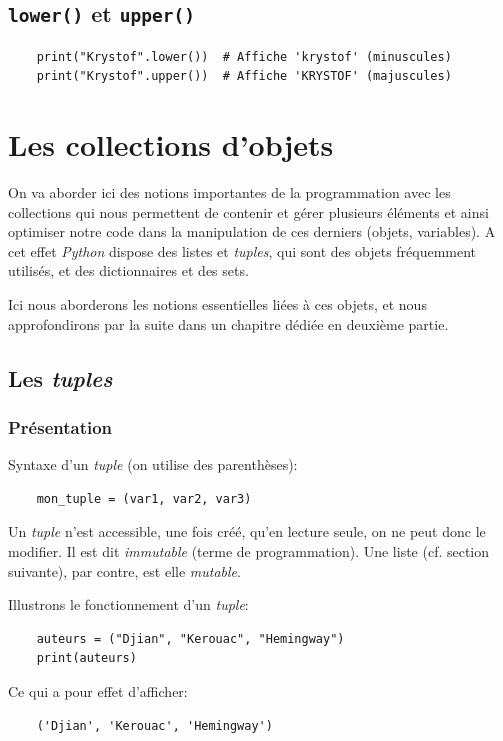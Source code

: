 \documentclass[a4paper,11pt]{book}
\begin{document}
\section{\texttt{lower()} et \texttt{upper()}}
\begin{verbatim}
    print("Krystof".lower())  # Affiche 'krystof' (minuscules)
    print("Krystof".upper())  # Affiche 'KRYSTOF' (majuscules)
\end{verbatim}
\medskip

\chapter{Les collections d'objets}\label{collections}
On va aborder ici des notions importantes de la programmation avec les collections qui nous permettent de contenir et gérer plusieurs éléments et ainsi optimiser notre code dans la manipulation de ces derniers (objets, variables). A cet effet \textit{Python} dispose des listes et \textit{tuples}, qui sont des objets fréquemment utilisés, et des dictionnaires et des sets.
\medskip

Ici nous aborderons les notions essentielles liées à ces objets, et nous approfondirons par la suite dans un chapitre dédiée en deuxième partie.
\medskip

\section{Les \textit{tuples}}
\subsection*{Présentation}
Syntaxe d'un \textit{tuple} (on utilise des parenthèses):
\begin{verbatim}
    mon_tuple = (var1, var2, var3)
\end{verbatim}
\medskip

Un \textit{tuple} n'est accessible, une fois créé, qu'en lecture seule, on ne peut donc le modifier. Il est dit \textit{immutable} (terme de programmation). Une liste (cf. section suivante), par contre, est elle \textit{mutable}.
\medskip

Illustrons le fonctionnement d'un \textit{tuple}:
\begin{verbatim}
    auteurs = ("Djian", "Kerouac", "Hemingway")
    print(auteurs)
\end{verbatim}
\medskip

Ce qui a pour effet d'afficher:
\begin{verbatim}
    ('Djian', 'Kerouac', 'Hemingway')
\end{verbatim}
\medskip
\end{document}
